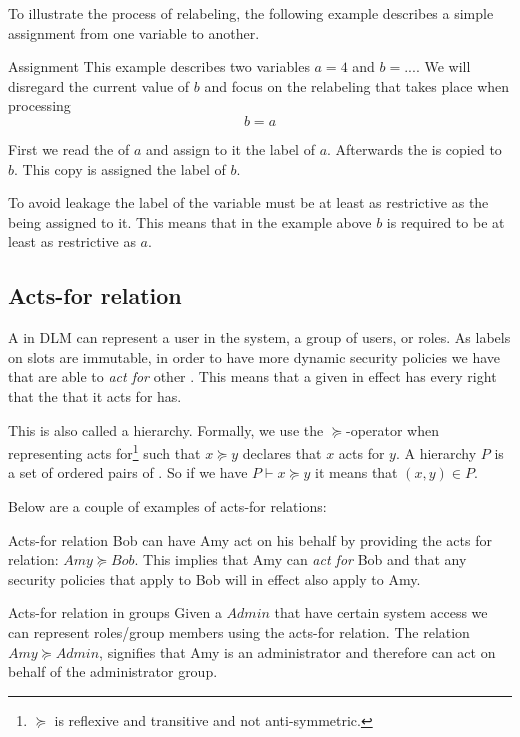 To illustrate the process of relabeling, the following example describes a simple assignment from one variable to another.

\begin{example}{Assignment}
  This example describes two variables $a = 4$ and $b = ...$.
  We will disregard the current value of $b$ and focus on the relabeling that takes place when processing $$b = a$$

  First we read the \xvalue{} of $a$ and assign to it the label of $a$.
  Afterwards the \xvalue{} is copied to $b$.
  This copy is assigned the label of $b$.
\end{example}

To avoid leakage the label of the variable must be at least as restrictive as the \xvalue{} being assigned to it.
This means that in the example above $b$ is required to be at least as restrictive as $a$.

\subsection{Acts-for relation}
A \principal{} in DLM can represent a user in the system, a group of users, or roles.
As labels on slots are immutable, in order to have more dynamic security policies we have that \principals{} are able to \textit{act for} other \principals{}.
This means that a given \principal{} in effect has every right that the \principal{} that it acts for has.

This is also called a \principal{} hierarchy.
Formally, we use the $\succeq$-operator when representing acts for\footnote{$\succeq$ is reflexive and transitive and not anti-symmetric.} such that $x \succeq y$ declares that $x$ acts for $y$.
A \principal{} hierarchy $P$ is a set of ordered pairs of \principals{}.
So if we have $P \vdash x \succeq y$ it means that $(x,y) \in P$.

Below are a couple of examples of acts-for relations:
\begin{example}{Acts-for relation}
  Bob can have Amy act on his behalf by providing the acts for relation: $Amy \succeq Bob$.
  This implies that Amy can \textit{act for} Bob and that any security policies that apply to Bob will in effect also apply to Amy.
\end{example}

\begin{example}{Acts-for relation in groups}
  Given a \principal{} $Admin$ that have certain system access we can represent roles/group members using the acts-for relation.
  The relation $Amy \succeq Admin$, signifies that Amy is an administrator and therefore can act on behalf of the administrator group. 
\end{example}

